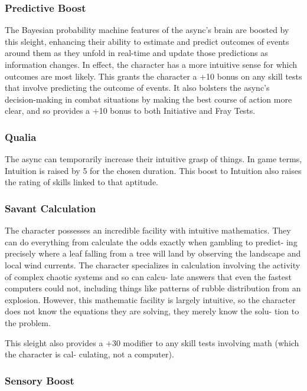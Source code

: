 \subsubsection{Predictive Boost}

The Bayesian probability machine features of the 
async's brain are boosted by this sleight, enhancing 
their ability to estimate and predict outcomes of 
events around them as they unfold in real-time and 
update those predictions as information changes. 
In effect, the character has a more intuitive sense 
for which outcomes are most likely. This grants the 
character a +10 bonus on any skill tests that involve 
predicting the outcome of events. It also bolsters 
the async's decision-making in combat situations by 
making the best course of action more clear, and so 
provides a +10 bonus to both Initiative and Fray Tests.

\subsubsection{Qualia}

The async can temporarily increase their intuitive 
grasp of things. In game terms, Intuition is raised by 
5 for the chosen duration. This boost to Intuition also 
raises the rating of skills linked to that aptitude.

\subsubsection{Savant Calculation}

The character possesses an incredible facility with 
intuitive mathematics. They can do everything from 
calculate the odds exactly when gambling to predict-
ing precisely where a leaf falling from a tree will land 
by observing the landscape and local wind currents. 
The character specializes in calculation involving the 
activity of complex chaotic systems and so can calcu-
late answers that even the fastest computers could not, 
including things like patterns of rubble distribution 
from an explosion. However, this mathematic facility 
is largely intuitive, so the character does not know the 
equations they are solving, they merely know the solu-
tion to the problem.

This sleight also provides a +30 modifier to any 
skill tests involving math (which the character is cal-
culating, not a computer).

\subsubsection{Sensory Boost}

